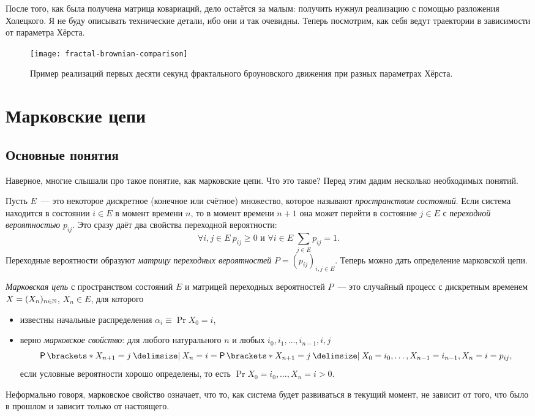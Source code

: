 После того, как была получена матрица ковариаций, дело остаётся за малым: 
получить нужнул реализацию с помощью разложения Холецкого. Я не буду описывать 
технические детали, ибо они и так очевидны. Теперь посмотрим, как себя ведут 
траектории в зависимости от параметра Хёрста.
\begin{figure}[H]
	\hspace{-0.01\textwidth} 
	\centering\texttt{[image: fractal-brownian-comparison]}
	\caption{Пример реализаций первых десяти секунд фрактального броуновского 
	движения при разных параметрах Хёрста.}
\end{figure}

\section{Марковские цепи}
\subsection{Основные понятия}
Наверное, многие слышали про такое понятие, как марковские цепи. Что это такое? 
Перед этим дадим несколько необходимых понятий.

Пусть \(E\)~--- это некоторое дискретное (конечное или счётное) множество, 
которое называют \emph{пространством состояний}. Если система находится в 
состоянии \(i \in E\) в момент времени \(n\), то в момент времени \(n + 1\) она 
может перейти в состояние \(j \in E\) с \emph{переходной вероятностью} 
\(p_{ij}\). Это сразу даёт два свойства переходной вероятности:
\[
	\forall i, j \in E\ p_{ij} \geq 0 \text{ и } \forall i \in E\ \sum_{j \in 
	E} p_{ij} = 1.
\]
Переходные вероятности образуют \emph{матрицу переходных вероятностей} \(P = 
(p_{ij})_{i, j \in E}\). Теперь можно дать определение марковской цепи.
\begin{definition}
	\emph{Марковская цепь} с пространством состояний \(E\) и матрицей 
	переходных вероятностей \(P\)~--- это случайный процесс с дискретным 
	временем \(X = (X_{n})_{n \in \mathbb{N}}\), \(X_{n} \in E\), для которого
	\begin{itemize}
		\item известны начальные распределения \(\alpha_{i} \equiv \Pr{X_{0} = 
		i}\),
		\item верно \emph{марковское свойство}: для любого натурального \(n\) и 
		любых \(i_{0}, i_{1}, \dots, i_{n - 1}, i, j\)
		\[
		\Pr{X_{n + 1} = j \given X_{n} = i} = \Pr{X_{n + 1} = j \given X_{0} = 
			i_{0}, \dots, X_{n - 1} = i_{n - 1}, X_{n} = i} = p_{ij},
		\]
		если условные вероятности хорошо определены, то есть \(\Pr{X_{0} = 
		i_{0}, \dots, X_{n} = i} > 0\).
	\end{itemize}
\end{definition}
Неформально говоря, марковское свойство означает, что то, как система будет 
развиваться в текущий момент, не зависит от того, что было в прошлом и зависит 
только от настоящего.

